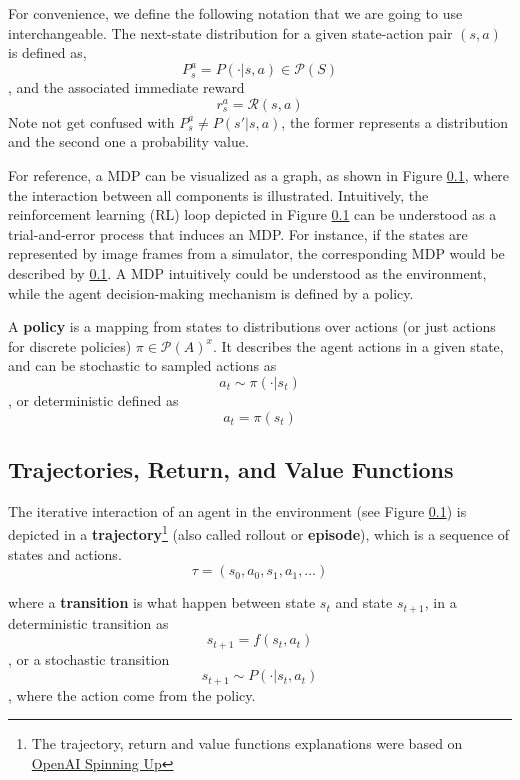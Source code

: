 For convenience, we define the following notation that we are going to use interchangeable. The next-state distribution for a given state-action pair $(s, a)$ is defined as,
$$P^a_s = P(\cdot|s, a) \in \mathcal{P}(S)$$, and the associated immediate reward 
$$r^a_s = \mathcal{R}(s,a)$$ 
Note not get confused with $P^a_s \neq P(s'|s, a)$, the former represents a distribution and the second one a probability value.

For reference, a MDP can be visualized as a graph, as shown in Figure \ref{}, where the interaction between all components is illustrated. Intuitively, the reinforcement learning (RL) loop depicted in Figure \ref{} can be understood as a trial-and-error process that induces an MDP. For instance, if the states are represented by image frames from a simulator, the corresponding MDP would be described by \ref{}. A MDP intuitively could be understood as the environment, while the agent decision-making mechanism is defined by a policy.

A \textbf{policy} is a mapping from states to distributions over actions (or just actions for discrete policies) $\pi \in \mathcal{P}(A)^x$. It describes the agent actions in a given state, and can be stochastic to sampled actions as
\begin{equation}
    a_t \sim \pi(\cdot|s_t)
\end{equation}
, or deterministic defined as 
\begin{equation}
a_t = \pi(s_t)    
\end{equation} 

\subsection{Trajectories, Return, and Value Functions}

The iterative interaction of an agent in the environment (see Figure \ref{}) is depicted in a \textbf{trajectory}\footnote{The trajectory, return and value functions explanations were based on \href{https://spinningup.openai.com/en/latest/spinningup/rl_intro.html}{OpenAI Spinning Up}} (also called rollout or \textbf{episode}), which is a sequence of states and actions.
$$\tau = (s_0, a_0, s_1, a_1, \dots )$$

where a \textbf{transition} is what happen between state $s_t$ and state $s_{t+1}$, in a deterministic transition as 
$$s_{t+1} = f(s_t, a_t)$$, 
or a stochastic transition $$s_{t+1} \sim P(\cdot | s_t, a_t)$$, where the action come from the policy.

